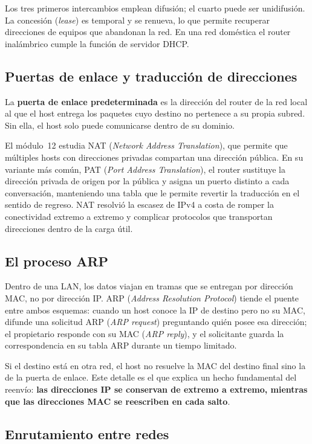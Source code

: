 \documentclass[11pt,a4paper]{article}
\begin{document}
Los tres primeros intercambios emplean difusión; el cuarto puede ser
unidifusión. La concesión (\textit{lease}) es temporal y se renueva, lo que
permite recuperar direcciones de equipos que abandonan la red. En una red
doméstica el router inalámbrico cumple la función de servidor DHCP.

\subsection{Puertas de enlace y traducción de direcciones}

La \textbf{puerta de enlace predeterminada} es la dirección del router de la
red local al que el host entrega los paquetes cuyo destino no pertenece a su
propia subred. Sin ella, el host solo puede comunicarse dentro de su dominio.

El módulo~12 estudia NAT (\textit{Network Address Translation}), que permite
que múltiples hosts con direcciones privadas compartan una dirección pública.
En su variante más común, PAT (\textit{Port Address Translation}), el router
sustituye la dirección privada de origen por la pública y asigna un puerto
distinto a cada conversación, manteniendo una tabla que le permite revertir la
traducción en el sentido de regreso. NAT resolvió la escasez de IPv4 a costa
de romper la conectividad extremo a extremo y complicar protocolos que
transportan direcciones dentro de la carga útil.

\subsection{El proceso ARP}

Dentro de una LAN, los datos viajan en tramas que se entregan por dirección
MAC, no por dirección IP. ARP (\textit{Address Resolution Protocol}) tiende el
puente entre ambos esquemas: cuando un host conoce la IP de destino pero no su
MAC, difunde una solicitud ARP (\textit{ARP request}) preguntando quién posee
esa dirección; el propietario responde con su MAC (\textit{ARP reply}), y el
solicitante guarda la correspondencia en su tabla ARP durante un tiempo
limitado.

Si el destino está en otra red, el host no resuelve la MAC del destino final
sino la de la puerta de enlace. Este detalle es el que explica un hecho
fundamental del reenvío: \textbf{las direcciones IP se conservan de extremo a
extremo, mientras que las direcciones MAC se reescriben en cada salto}.

\subsection{Enrutamiento entre redes}
\end{document}
